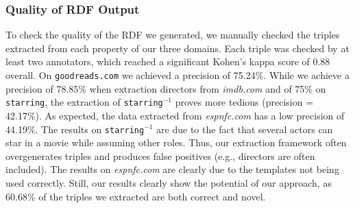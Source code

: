 \documentclass{llncs}
\begin{document}
\subsubsection{Quality of RDF Output}
To check the quality of the RDF we generated, we manually checked the triples extracted from each property of our three domains.
Each triple was checked by at least two annotators, which reached a significant Kohen's kappa score of 0.88 overall.
On \texttt{goodreads.com} we achieved a precision of 75.24\%.
While we achieve a precision of 78.85\% when extraction directors from \emph{imdb.com} and of 75\% on \texttt{starring}, the extraction of \texttt{starring}$^{-1}$ proves more tedious (precision = 42.17\%).
As expected, the data extracted from \emph{espnfc.com} has a low precision of 44.19\%.
The results on \texttt{starring}$^{-1}$ are due to the fact that several actors can star in a movie while assuming other roles. 
Thus, our extraction framework often overgenerates triples and produces false positives (e.g., directors are often included).
The results on \emph{espnfc.com} are clearly due to the templates not being used correctly.
Still, our results clearly show the potential of our approach, as 60.68\% of the triples we extracted are both correct and novel.
\end{document}
